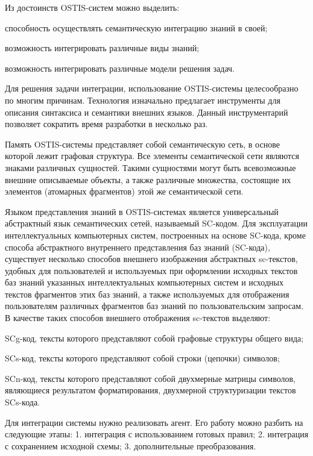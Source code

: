 Из достоинств OSTIS-систем можно выделить:
\begin{textitemize}
    \item способность осуществлять семантическую интеграцию знаний в своей;
    \item возможность интегрировать различные виды знаний;
    \item возможность интегрировать различные модели решения задач.
\end{textitemize}

Для решения задачи интеграции, использование OSTIS-системы целесообразно по многим причинам. Технология изначально предлагает инструменты для описания синтаксиса и семантики внешних языков. Данный инструментарий позволяет сократить время разработки в несколько раз.

Память OSTIS-системы представляет собой семантическую сеть, в основе которой лежит графовая структура. Все элементы семантической сети являются знаками различных сущностей. Такими сущностями могут быть всевозможные внешние описываемые объекты, а также различные множества, состоящие их элементов (атомарных фрагментов) этой же семантической сети.

Языком представления знаний в OSTIS-системах является универсальный абстрактный язык семантических сетей, называемый SC-кодом. Для эксплуатации интеллектуальных компьютерных систем, построенных на основе SC-кода, кроме способа абстрактного внутреннего представления баз знаний (SC-кода), существует несколько способов внешнего изображения абстрактных sc-текстов, удобных для пользователей и используемых при оформлении исходных текстов баз знаний указанных интеллектуальных компьютерных систем и исходных текстов фрагментов этих баз знаний, а также используемых для отображения пользователям различных фрагментов баз знаний по пользовательским запросам. В качестве таких способов внешнего отображения sc-текстов выделяют:
\begin{textitemize}
    \item SCg-код, тексты которого представляют собой графовые структуры общего вида;
    \item SCs-код, тексты которого представляют собой строки (цепочки) символов;
    \item SCn-код, тексты которого представляют собой двухмерные матрицы символов, являющиеся результатом форматирования, двухмерной структуризации текстов SCs-кода.
\end{textitemize}

Для интеграции системы нужно реализовать агент. Его работу можно разбить на следующие этапы:
1. интеграция с использованием готовых правил;
2. интеграция с сохранением исходной схемы;
3. дополнительные преобразования.

